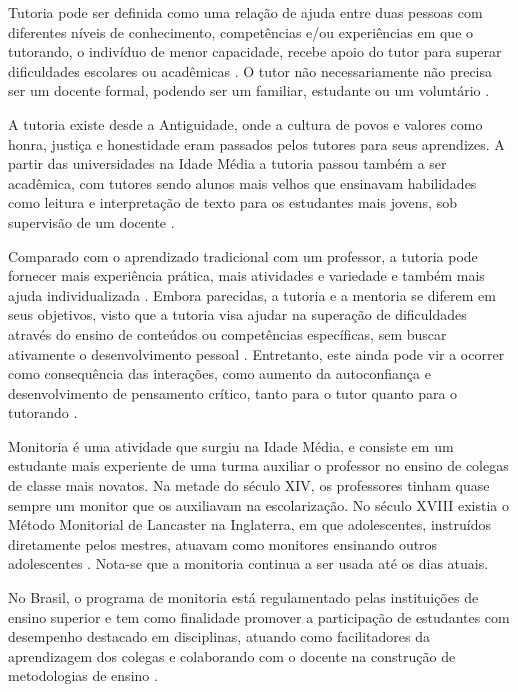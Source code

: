 Tutoria pode ser definida como uma relação de ajuda entre duas pessoas com diferentes níveis de conhecimento, competências e/ou experiências em que o tutorando, o indivíduo de menor capacidade, recebe apoio do tutor para superar dificuldades escolares ou acadêmicas \cite{opp2024mentoria}. O tutor não necessariamente não precisa ser um docente formal, podendo ser um familiar, estudante ou um voluntário \cite{topping2000tutoring}.

A tutoria existe desde a Antiguidade, onde a cultura de povos e valores como honra, justiça e honestidade eram passados pelos tutores para seus aprendizes. A partir das universidades na Idade Média a tutoria passou também a ser acadêmica, com tutores sendo alunos mais velhos que ensinavam habilidades como leitura e interpretação de texto para os estudantes mais jovens, sob supervisão de um docente \cite{geib2007tutoria}.

Comparado com o aprendizado tradicional com um professor, a tutoria pode fornecer mais experiência prática, mais atividades e variedade e também mais ajuda individualizada \cite{topping2000tutoring}. Embora parecidas, a tutoria e a mentoria se diferem em seus objetivos, visto que a tutoria visa ajudar na superação de dificuldades através do ensino de conteúdos ou competências específicas, sem buscar ativamente o desenvolvimento pessoal \cite{opp2024mentoria}. Entretanto, este ainda pode vir a ocorrer como consequência das interações, como aumento da autoconfiança e desenvolvimento de pensamento crítico, tanto para o tutor quanto para o tutorando \cite{lin2025peer}.

Monitoria é uma atividade que surgiu na Idade Média, e consiste em um estudante mais experiente de uma turma auxiliar o professor no ensino de colegas de classe mais novatos. Na metade do século XIV, os professores tinham quase sempre um monitor que os auxiliavam na escolarização. No século XVIII existia o Método Monitorial de Lancaster na Inglaterra, em que adolescentes, instruídos diretamente pelos mestres, atuavam como monitores ensinando outros adolescentes \cite{frison2016monitoria}. Nota-se que a monitoria continua a ser usada até os dias atuais.

No Brasil, o programa de monitoria está regulamentado pelas instituições de ensino superior e tem como finalidade promover a participação de estudantes com desempenho destacado em disciplinas, atuando como facilitadores da aprendizagem dos colegas e colaborando com o docente na construção de metodologias de ensino \cite{monitoria2025}.

